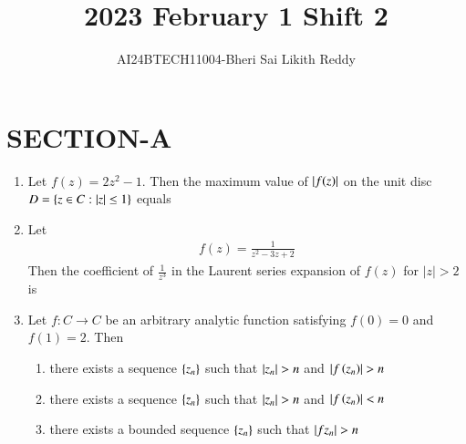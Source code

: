 \documentclass[journal]{IEEEtran}
\begin{document}

\onecolumn
\newpage
\title{2023 February 1 Shift 2}
\author{AI24BTECH11004-Bheri Sai Likith Reddy}
\maketitle
\section{SECTION-A}
\begin{enumerate}
       \item Let $f(z)=2 z^{2}-1$. Then the maximum value of $\left\vert f(z)\right\vert$ on the unit disc $D=\left\{z \in C:\left\vert z\right\vert \leq 1\right\}$ equals
	       \begin{enumerate}
        	\end{enumerate}	
	\item Let 
             \begin{align*}  
		f(z)=\frac{1}{z^{2}-3 z+2}
              \end{align*}
	         Then the coefficient of $\frac{1}{z^{3}}$ in the Laurent series expansion of $f(z)$ for $|z|>2$ is
               \begin{enumerate}
			        \begin{multicols}{4}  
		       \item $1$
		       \item $2$
		       \item $3$
		       \item $4$
                    \end{multicols}   
	       \end{enumerate}	
       \item Let $f: C \rightarrow C$ be an arbitrary analytic function satisfying $f(0)=0$ and $f(1)=2$. Then
		\begin{enumerate}
			\item there exists a sequence $\left\{z_{n}\right\}$ such that $\left\vert z_{n}\right\vert>n$ and $\left\vert f\left(z_{n}\right)\right\vert>n$
			\item there exists a sequence $\left\{z_{n}\right\}$ such that $\left\vert z_{n}\right\vert>n$ and $\left\vert f\left(z_{n}\right)\right\vert<n$
			\item there exists a bounded sequence $\left\{z_{n}\right\}$ such that $\left\vert f{z_{n}}\right\vert>n$

\end{enumerate}
\end{enumerate}
\end{document}
